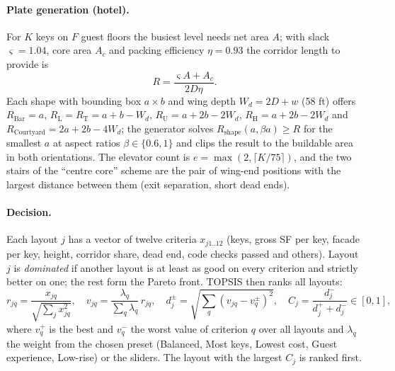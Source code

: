 \paragraph{Plate generation (hotel).} For $K$ keys on $F$ guest floors the busiest level needs net area $A$; with slack
$\varsigma = 1.04$, core area $A_c$ and packing efficiency $\eta = 0.93$ the corridor length to provide is
\[ R = \frac{\varsigma A + A_c}{2 D \eta}. \]
Each shape with bounding box $a \times b$ and wing depth $W_d = 2D + w$ (58 ft) offers
$R_{\text{Bar}} = a$, $R_{\text{L}} = R_{\text{T}} = a + b - W_d$, $R_{\text{U}} = a + 2b - 2W_d$,
$R_{\text{H}} = a + 2b - 2W_d$ and $R_{\text{Courtyard}} = 2a + 2b - 4W_d$; the generator solves $R_{\text{shape}}(a, \beta a) \ge R$
for the smallest $a$ at aspect ratios $\beta \in \{0.6, 1\}$ and clips the result to the buildable area in both
orientations. The elevator count is $e = \max(2, \lceil K/75 \rceil)$, and the two stairs of the ``centre core'' scheme are
the pair of wing-end positions with the largest distance between them (exit separation, short dead ends).

\paragraph{Decision.} Each layout $j$ has a vector of twelve criteria $x_{j1..12}$ (keys, gross SF per key, facade per key,
height, corridor share, dead end, code checks passed and others). Layout $j$ is \emph{dominated} if another layout is at
least as good on every criterion and strictly better on one; the rest form the Pareto front. TOPSIS then ranks all layouts:
\[ r_{jq} = \frac{x_{jq}}{\sqrt{\sum_j x_{jq}^2}}, \quad v_{jq} = \frac{\lambda_q}{\sum_q \lambda_q}\, r_{jq}, \quad
d_j^{\pm} = \sqrt{\sum_q (v_{jq} - v_q^{\pm})^2}, \quad C_j = \frac{d_j^-}{d_j^+ + d_j^-} \in [0,1], \]
where $v_q^+$ is the best and $v_q^-$ the worst value of criterion $q$ over all layouts and $\lambda_q$ the weight from the
chosen preset (Balanced, Most keys, Lowest cost, Guest experience, Low-rise) or the sliders. The layout with the largest
$C_j$ is ranked first.


